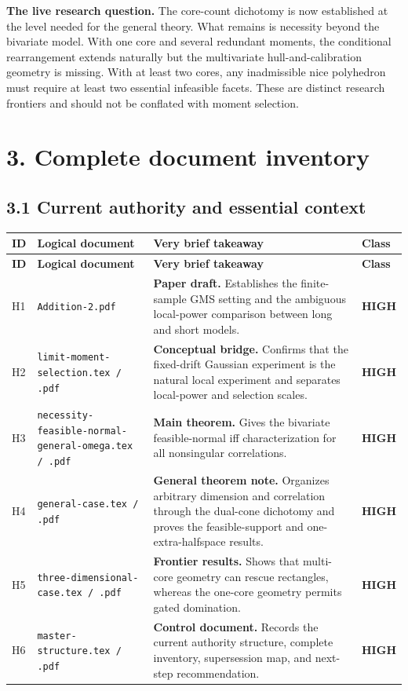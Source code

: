 \documentclass[10pt]{article}
\newcommand{\high}{\colorbox{highbg}{\textcolor{highfg}{\sffamily\bfseries HIGH}}}
\newcommand{\fname}[1]{{\footnotesize\nolinkurl{#1}}}
\begin{document}
\textbf{The live research question.}  The core-count dichotomy is now established at the level needed for the general theory.  What remains is necessity beyond the bivariate model.  With one core and several redundant moments, the conditional rearrangement extends naturally but the multivariate hull-and-calibration geometry is missing.  With at least two cores, any inadmissible nice polyhedron must require at least two essential infeasible facets.  These are distinct research frontiers and should not be conflated with moment selection.

\section*{3. Complete document inventory}

\subsection*{3.1 Current authority and essential context}

\begin{longtable}{@{}L{0.035\textwidth}L{0.285\textwidth}L{0.455\textwidth}L{0.125\textwidth}@{}}
\toprule
\textbf{ID} & \textbf{Logical document} & \textbf{Very brief takeaway} & \textbf{Class}\\
\midrule
\endfirsthead
\toprule
\textbf{ID} & \textbf{Logical document} & \textbf{Very brief takeaway} & \textbf{Class}\\
\midrule
\endhead
H1 & \fname{Addition-2.pdf} & \textbf{Paper draft.} Establishes the finite-sample GMS setting and the ambiguous local-power comparison between long and short models. & \high\\[4pt]
H2 & \fname{limit-moment-selection.tex / .pdf} & \textbf{Conceptual bridge.} Confirms that the fixed-drift Gaussian experiment is the natural local experiment and separates local-power and selection scales. & \high\\[4pt]
H3 & \fname{necessity-feasible-normal-general-omega.tex / .pdf} & \textbf{Main theorem.} Gives the bivariate feasible-normal iff characterization for all nonsingular correlations. & \high\\[4pt]
H4 & \fname{general-case.tex / .pdf} & \textbf{General theorem note.} Organizes arbitrary dimension and correlation through the dual-cone dichotomy and proves the feasible-support and one-extra-halfspace results. & \high\\[4pt]
H5 & \fname{three-dimensional-case.tex / .pdf} & \textbf{Frontier results.} Shows that multi-core geometry can rescue rectangles, whereas the one-core geometry permits gated domination. & \high\\[4pt]
H6 & \fname{master-structure.tex / .pdf} & \textbf{Control document.} Records the current authority structure, complete inventory, supersession map, and next-step recommendation. & \high\\
\bottomrule
\end{longtable}
\end{document}
